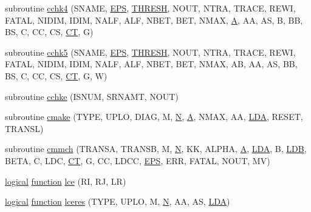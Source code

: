 \begin{DoxyCompactItemize}
\item 
subroutine \hyperlink{cblat3_8f_aee9d0f9d27751f8af596f77b307b0b62}{cchk4} (S\+N\+A\+M\+E, \hyperlink{tukey_8c_a6ebf6899d6c1c8b7b9d09be872c05aae}{E\+P\+S}, \hyperlink{zlaqgs_8c_a0656018abfc9fa2821827415f5d5ea57}{T\+H\+R\+E\+S\+H}, N\+O\+U\+T, N\+T\+R\+A, T\+R\+A\+C\+E, R\+E\+W\+I, F\+A\+T\+A\+L, N\+I\+D\+I\+M, I\+D\+I\+M, N\+A\+L\+F, A\+L\+F, N\+B\+E\+T, B\+E\+T, N\+M\+A\+X, \hyperlink{classA}{A}, A\+A, A\+S, B, B\+B, B\+S, C, C\+C, C\+S, \hyperlink{tau_8h_ae9ab3801c1afb4f20cfd669d76aec283}{C\+T}, G)
\item 
subroutine \hyperlink{cblat3_8f_a303e24924d096637e5256e947f9c96ab}{cchk5} (S\+N\+A\+M\+E, \hyperlink{tukey_8c_a6ebf6899d6c1c8b7b9d09be872c05aae}{E\+P\+S}, \hyperlink{zlaqgs_8c_a0656018abfc9fa2821827415f5d5ea57}{T\+H\+R\+E\+S\+H}, N\+O\+U\+T, N\+T\+R\+A, T\+R\+A\+C\+E, R\+E\+W\+I, F\+A\+T\+A\+L, N\+I\+D\+I\+M, I\+D\+I\+M, N\+A\+L\+F, A\+L\+F, N\+B\+E\+T, B\+E\+T, N\+M\+A\+X, A\+B, A\+A, A\+S, B\+B, B\+S, C, C\+C, C\+S, \hyperlink{tau_8h_ae9ab3801c1afb4f20cfd669d76aec283}{C\+T}, G, W)
\item 
subroutine \hyperlink{cblat3_8f_a442921d6b8d50c2e886d7a6c7fff3657}{cchke} (I\+S\+N\+U\+M, S\+R\+N\+A\+M\+T, N\+O\+U\+T)
\item 
subroutine \hyperlink{cblat3_8f_ac7d8289c3502c0db8242048b55f54c55}{cmake} (T\+Y\+P\+E, U\+P\+L\+O, D\+I\+A\+G, M, \hyperlink{polmisc_8c_a0240ac851181b84ac374872dc5434ee4}{N}, \hyperlink{classA}{A}, N\+M\+A\+X, A\+A, \hyperlink{example__user_8c_ae946da542ce0db94dced19b2ecefd1aa}{L\+D\+A}, R\+E\+S\+E\+T, T\+R\+A\+N\+S\+L)
\item 
subroutine \hyperlink{cblat3_8f_a2f2689e1cf879a01d41038be8bb3515e}{cmmch} (T\+R\+A\+N\+S\+A, T\+R\+A\+N\+S\+B, M, \hyperlink{polmisc_8c_a0240ac851181b84ac374872dc5434ee4}{N}, K\+K, A\+L\+P\+H\+A, \hyperlink{classA}{A}, \hyperlink{example__user_8c_ae946da542ce0db94dced19b2ecefd1aa}{L\+D\+A}, B, \hyperlink{example__user_8c_a50e90a7104df172b5a89a06c47fcca04}{L\+D\+B}, B\+E\+T\+A, C, L\+D\+C, \hyperlink{tau_8h_ae9ab3801c1afb4f20cfd669d76aec283}{C\+T}, G, C\+C, L\+D\+C\+C, \hyperlink{tukey_8c_a6ebf6899d6c1c8b7b9d09be872c05aae}{E\+P\+S}, E\+R\+R, F\+A\+T\+A\+L, N\+O\+U\+T, M\+V)
\item 
\hyperlink{tnc_8c_aa7b64cdf39500931f7b333343791a104}{logical} \hyperlink{afunc_8m_a7b5e596df91eadea6c537c0825e894a7}{function} \hyperlink{cblat3_8f_a539812fa849b37b050afd971a3c70150}{lce} (R\+I, R\+J, L\+R)
\item 
\hyperlink{tnc_8c_aa7b64cdf39500931f7b333343791a104}{logical} \hyperlink{afunc_8m_a7b5e596df91eadea6c537c0825e894a7}{function} \hyperlink{cblat3_8f_a7f3b9f2161068834ddf46e1fcc1217d9}{lceres} (T\+Y\+P\+E, U\+P\+L\+O, M, \hyperlink{polmisc_8c_a0240ac851181b84ac374872dc5434ee4}{N}, A\+A, A\+S, \hyperlink{example__user_8c_ae946da542ce0db94dced19b2ecefd1aa}{L\+D\+A})

\end{DoxyCompactItemize}
